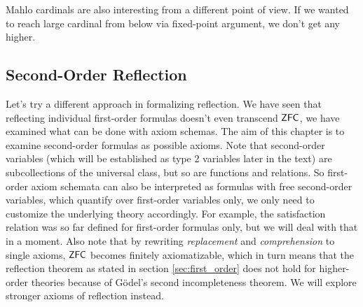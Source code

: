 \documentclass[12pt,a4paper]{article}
\newcommand{\then}{\rightarrow}
\begin{document}
Mahlo cardinals are also interesting from a different point of view. If we wanted to reach large cardinal from below via fixed-point argument, we don't get any higher.






\subsection{Second-Order Reflection}
Let's try a different approach in formalizing reflection. We have seen that reflecting individual first-order formulas doesn't even transcend $\sf{ZFC}$, we have examined what can be done with axiom schemas. The aim of this chapter is to examine second-order formulas as possible axioms. Note that second-order variables (which will be established as type 2 variables later in the text) are subcollections of the universal class, but so are functions and relations. So first-order axiom schemata can also be interpreted as formulas with free second-order variables, which quantify over first-order variables only, we only need to customize the underlying theory accordingly. For example, the satisfaction relation was so far defined for first-order formulas only, but we will deal with that in a moment. Also note that by rewriting \emph{replacement} and \emph{comprehension} to single axioms, $\sf{ZFC}$ becomes finitely axiomatizable, which in turn means that the reflection theorem as stated in section \ref{sec:first_order} does not hold for higher-order theories because of Gödel's second incompleteness theorem. We will explore stronger axioms of reflection instead.
\end{document}
